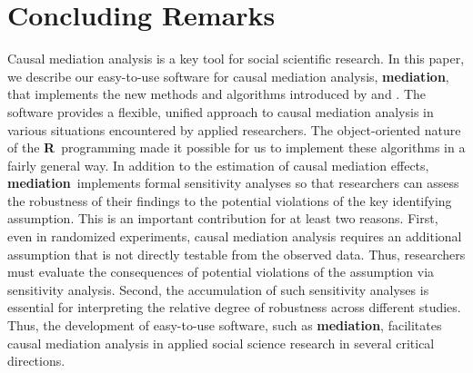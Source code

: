 \documentclass[11pt,letterpaper]{article}
\theoremstyle{plain}
\newcommand\bR{{\bf R}}
\newcommand\bmediation{{\bf mediation}}
\begin{document}
\section{Concluding Remarks}

Causal mediation analysis is a key tool for social scientific
research. In this paper, we describe our easy-to-use software for
causal mediation analysis, \bmediation, that implements the new
methods and algorithms introduced by \citet*{imai:keel:yama:10} and
\citet*{imai:keel:ting:11}.  The software provides a flexible, unified
approach to causal mediation analysis in various situations
encountered by applied researchers.  The object-oriented nature of the
\bR\ programming made it possible for us to implement these algorithms
in a fairly general way.  In addition to the estimation of causal
mediation effects, \bmediation\ implements formal sensitivity analyses
so that researchers can assess the robustness of their findings to the
potential violations of the key identifying assumption.  This is an
important contribution for at least two reasons.  First, even in
randomized experiments, causal mediation analysis requires an
additional assumption that is not directly testable from the observed
data.  Thus, researchers must evaluate the consequences of potential
violations of the assumption via sensitivity analysis.  Second, the
accumulation of such sensitivity analyses is essential for
interpreting the relative degree of robustness across different
studies.  Thus, the development of easy-to-use software, such as
\bmediation, facilitates causal mediation analysis in applied social
science research in several critical directions.


\clearpage
{}

\end{document}
